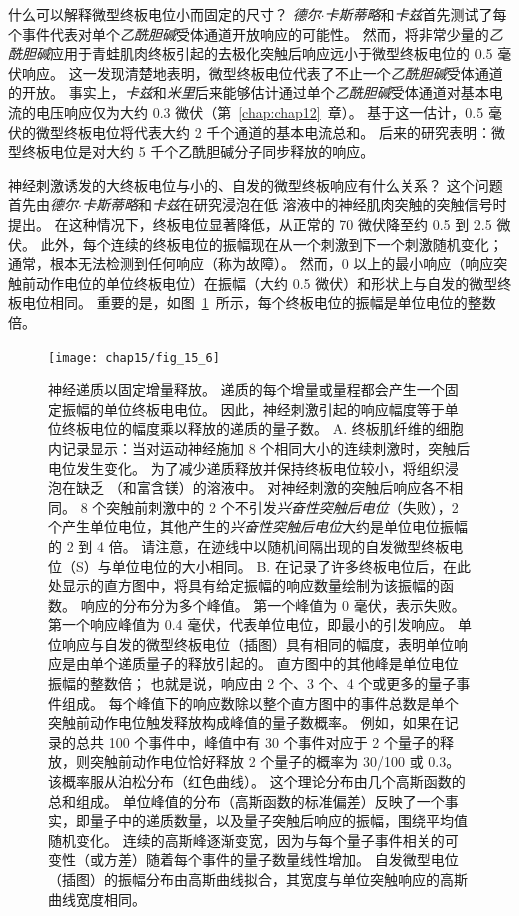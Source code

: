 什么可以解释微型终板电位小而固定的尺寸？
\textit{德尔$\cdot$卡斯蒂略}和\textit{卡兹}首先测试了每个事件代表对单个\textit{乙酰胆碱}受体通道开放响应的可能性。
然而，将非常少量的\textit{乙酰胆碱}应用于青蛙肌肉终板引起的去极化突触后响应远小于微型终板电位的 0.5 毫伏响应。 
这一发现清楚地表明，微型终板电位代表了不止一个\textit{乙酰胆碱}受体通道的开放。
事实上，\textit{卡兹}和\textit{米里}后来能够估计通过单个\textit{乙酰胆碱}受体通道对基本电流的电压响应仅为大约 0.3 微伏（第~\ref{chap:chap12}~章）。
基于这一估计，0.5 毫伏的微型终板电位将代表大约 2 千个通道的基本电流总和。
后来的研究表明：微型终板电位是对大约 5 千个乙酰胆碱分子同步释放的响应。


神经刺激诱发的大终板电位与小的、自发的微型终板响应有什么关系？
这个问题首先由\textit{德尔$\cdot$卡斯蒂略}和\textit{卡兹}在研究浸泡在低  溶液中的神经肌肉突触的突触信号时提出。
在这种情况下，终板电位显著降低，从正常的 70 微伏降至约 0.5 到 2.5 微伏。
此外，每个连续的终板电位的振幅现在从一个刺激到下一个刺激随机变化；
通常，根本无法检测到任何响应（称为故障）。
然而，0 以上的最小响应（响应突触前动作电位的单位终板电位）在振幅（大约 0.5 微伏）和形状上与自发的微型终板电位相同。
重要的是，如图~\ref{fig:15_6}~所示，每个终板电位的振幅是单位电位的整数倍。


\begin{figure}[htbp]
	\centering
	\texttt{[image: chap15/fig\_15\_6]}
	\caption{神经递质以固定增量释放。
		递质的每个增量或量程都会产生一个固定振幅的单位终板电电位。
		因此，神经刺激引起的响应幅度等于单位终板电位的幅度乘以释放的递质的量子数。
		A. 终板肌纤维的细胞内记录显示：当对运动神经施加 8 个相同大小的连续刺激时，突触后电位发生变化。
		为了减少递质释放并保持终板电位较小，将组织浸泡在缺乏 （和富含镁）的溶液中。
		对神经刺激的突触后响应各不相同。
		8 个突触前刺激中的 2 个不引发\textit{兴奋性突触后电位}（失败），2 个产生单位电位，其他产生的\textit{兴奋性突触后电位}大约是单位电位振幅的 2 到 4 倍。
		请注意，在迹线中以随机间隔出现的自发微型终板电位（S）与单位电位的大小相同\cite{liley1956quantal}。
		B. 在记录了许多终板电位后，在此处显示的直方图中，将具有给定振幅的响应数量绘制为该振幅的函数。
		响应的分布分为多个峰值。
		第一个峰值为 0 毫伏，表示失败。
		第一个响应峰值为 0.4 毫伏，代表单位电位，即最小的引发响应。
		单位响应与自发的微型终板电位（插图）具有相同的幅度，表明单位响应是由单个递质量子的释放引起的。
		直方图中的其他峰是单位电位振幅的整数倍；
		也就是说，响应由 2 个、3 个、4 个或更多的量子事件组成。
		每个峰值下的响应数除以整个直方图中的事件总数是单个突触前动作电位触发释放构成峰值的量子数概率。
		例如，如果在记录的总共 100 个事件中，峰值中有 30 个事件对应于 2 个量子的释放，则突触前动作电位恰好释放 2 个量子的概率为 30/100 或 0.3。
		该概率服从泊松分布（红色曲线）。
		这个理论分布由几个高斯函数的总和组成。
		单位峰值的分布（高斯函数的标准偏差）反映了一个事实，即量子中的递质数量，以及量子突触后响应的振幅，围绕平均值随机变化。
		连续的高斯峰逐渐变宽，因为与每个量子事件相关的可变性（或方差）随着每个事件的量子数量线性增加。
		自发微型电位（插图）的振幅分布由高斯曲线拟合，其宽度与单位突触响应的高斯曲线宽度相同\cite{boyd1956end}。}
	\label{fig:15_6}
\end{figure}


